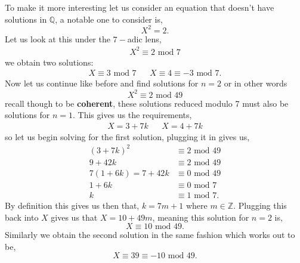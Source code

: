 \documentclass[12pt]{article}
\theoremstyle{definition}
\theoremstyle{remark}
\newcommand{\zz}{\mathbb Z}   %
\newcommand{\qq}{\mathbb Q}   %
\begin{document}
  To make it more interesting let us consider an equation that doesn't have solutions in $\qq$, a notable one to consider is,
  \[X^{2} = 2.\]
  Let us look at this under the $7-$adic lens,
  \begin{align*}
    X^{2} \equiv 2 \text{ mod } 7
  \end{align*}
  we obtain two solutions:
  \begin{align*}
    X \equiv 3 \text{ mod } 7 && X \equiv 4 \equiv -3 \text{ mod } 7. 
  \end{align*}
  Now let us continue like before and find solutions for $n =2$ or in other words 
  \[X^{2} \equiv 2 \text{ mod }49\]
  recall though to be \textbf{coherent}, these solutions reduced modulo 7 must also be solutions for $n = 1$. This gives us the requirements,
  \begin{align*}
    X = 3+ 7k && X = 4 + 7k
  \end{align*}
  so let us begin solving for the first solution, plugging it in gives us,
  \begin{align*}
    (3 + 7k)^{2} &\equiv 2 \text{ mod }49 \\
    9 + 42k &\equiv 2 \text{ mod }49  \\
    7(1 + 6k)= 7 + 42k &\equiv 0 \text{ mod }49 \\
    1 + 6k & \equiv 0 \text{ mod }7 \\
    k &\equiv 1 \text{ mod }7.
  \end{align*}
  By definition this gives us then that, $k = 7m + 1$ where $m \in \zz$. Plugging this back into $X$ gives us that $X = 10 + 49m$, meaning this solution for $n = 2$ is,
  \[X \equiv 10 \text{ mod } 49. \]
  Similarly we obtain the second solution in the same fashion which works out to be, \[X \equiv 39 \equiv -10 \text{ mod }49.\]
\end{document}
